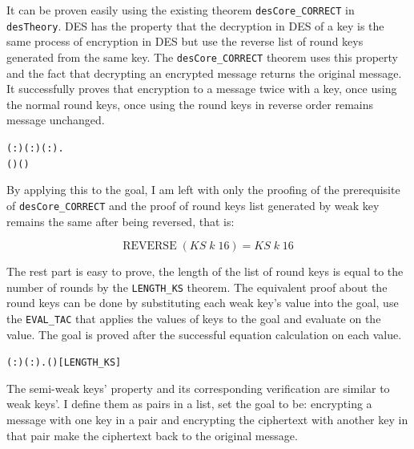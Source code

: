 \documentclass{article}
\begin{document}
It can be proven easily using the existing theorem \verb|desCore_CORRECT| in \verb|desTheory|. DES has the property that
the decryption in DES of a key is the same process of encryption in DES but use the reverse list of round keys generated
from the same key. The \verb|desCore_CORRECT| theorem uses this property and the fact that decrypting an encrypted message
returns the original message. It successfully proves that encryption to a message twice with a key,
once using the normal round keys, once using the round keys in reverse order remains message unchanged.

\begin{alltt}
\HOLTokenTurnstile{} \HOLSymConst{\HOLTokenForall{}}( : ) ( :) ( :).
       \HOLSymConst{=}  \HOLSymConst{\HOLTokenImp{}}
       ( ) (   ) \HOLSymConst{=}
\end{alltt}

By applying this to the goal, I am left with only the proofing of the prerequisite of \verb|desCore_CORRECT| and the
proof of round keys list generated by weak key remains the same after being reversed, that is:

\begin{equation*}
   \mathrm{REVERSE} \; (KS \; k \; 16) = KS \; k \; 16
\end{equation*}

The rest part is easy to prove, the length of the list of round keys is equal to the number of rounds by the \verb|LENGTH_KS|
theorem. The equivalent proof about the round keys can be done by substituting each weak key's value into the goal,
use the \verb|EVAL_TAC| that applies the values of keys to the goal and evaluate on the value. The goal is proved after
the successful equation calculation on each value.

\begin{alltt}
\HOLTokenTurnstile{} \HOLSymConst{\HOLTokenForall{}}( :) ( :).  (  ) \HOLSymConst{=} \hfill{[LENGTH_KS]}
\end{alltt}

The semi-weak keys' property and its corresponding verification are similar to weak keys'. I define them as pairs in a list,
set the goal to be: encrypting a message with one key in a pair and encrypting the ciphertext with another key
in that pair make the ciphertext back to the original message.
\end{document}

